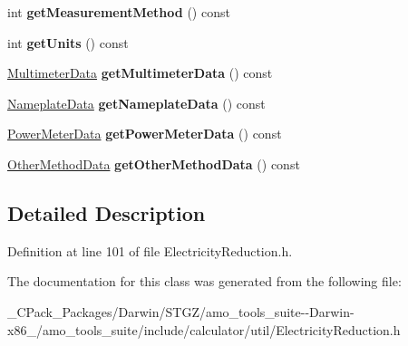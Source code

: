 \begin{DoxyCompactItemize}
int {\bfseries get\+Measurement\+Method} () const
\item 
\mbox{\label{class_electricity_reduction_input_a146159d4cac2232f7ef29e4b2ac58327}} 
int {\bfseries get\+Units} () const
\item 
\mbox{\label{class_electricity_reduction_input_a2a68f5f0b38e54aee9dfcf3ab490d07d}} 
\hyperlink{class_multimeter_data}{Multimeter\+Data} {\bfseries get\+Multimeter\+Data} () const
\item 
\mbox{\label{class_electricity_reduction_input_a2d63fc41d86ea60fe16389bab1b4ac09}} 
\hyperlink{class_nameplate_data}{Nameplate\+Data} {\bfseries get\+Nameplate\+Data} () const
\item 
\mbox{\label{class_electricity_reduction_input_a4ba54572c92951231af9c506d3f494e7}} 
\hyperlink{class_power_meter_data}{Power\+Meter\+Data} {\bfseries get\+Power\+Meter\+Data} () const
\item 
\mbox{\label{class_electricity_reduction_input_a9963ea6b61ac8bb57026e3e2c7d307ca}} 
\hyperlink{class_other_method_data}{Other\+Method\+Data} {\bfseries get\+Other\+Method\+Data} () const
\end{DoxyCompactItemize}


\subsection{Detailed Description}


Definition at line 101 of file Electricity\+Reduction.\+h.



The documentation for this class was generated from the following file\+:\begin{DoxyCompactItemize}
\item 
\+\_\+\+C\+Pack\+\_\+\+Packages/\+Darwin/\+S\+T\+G\+Z/amo\+\_\+tools\+\_\+suite-\/-\/\+Darwin-\/x86\+\_/amo\+\_\+tools\+\_\+suite/include/calculator/util/Electricity\+Reduction.\+h\end{DoxyCompactItemize}
